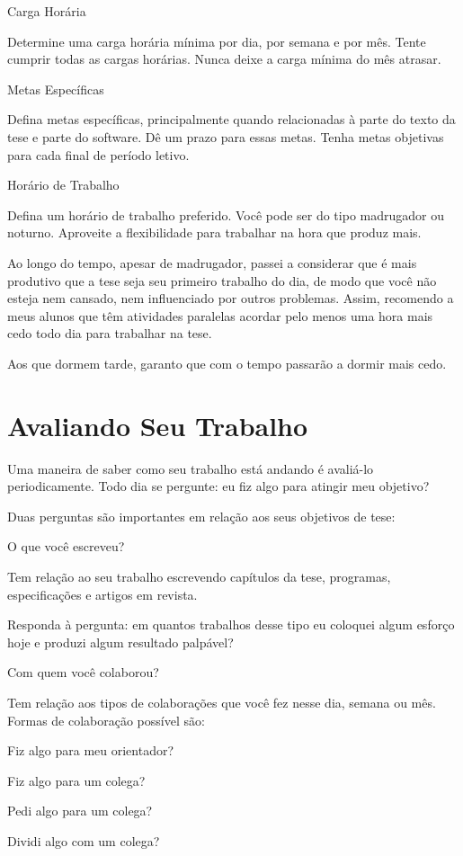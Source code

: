 \begin{outline}
\1	Carga Horária


\2	Determine uma carga horária mínima por dia, por semana e por mês. Tente cumprir todas as cargas horárias. Nunca deixe a carga mínima do mês atrasar.


\1	Metas Específicas


\2	Defina metas específicas, principalmente quando relacionadas à parte do texto da tese e parte do software. Dê um prazo para essas metas. Tenha metas objetivas para cada final de período letivo.


\1	Horário de Trabalho


\2	Defina um horário de trabalho preferido. Você pode ser do tipo madrugador ou noturno. Aproveite a flexibilidade para trabalhar na hora que produz mais. 


\3	Ao longo do tempo, apesar de madrugador, passei a considerar que é mais produtivo que a tese seja seu primeiro trabalho do dia, de modo que você não esteja nem cansado, nem influenciado por outros problemas. Assim, recomendo a meus alunos que têm atividades paralelas acordar pelo menos uma hora mais cedo todo dia para trabalhar na tese.


\1	Aos que dormem tarde, garanto que com o tempo passarão a dormir mais cedo.
\end{outline}

\section{Avaliando Seu Trabalho}


Uma maneira de saber como seu trabalho está andando é avaliá-lo periodicamente. Todo dia se pergunte: eu fiz algo para atingir meu objetivo?


Duas perguntas são importantes em relação aos seus objetivos de tese:

\begin{outline}
\1	O que você escreveu?


\2	Tem relação ao seu trabalho escrevendo capítulos da tese, programas, especificações e artigos em revista. 


\2	Responda à pergunta: em quantos trabalhos desse tipo eu coloquei algum esforço hoje e produzi algum resultado palpável?


\1	Com quem você colaborou?


\2	Tem relação aos tipos de colaborações que você fez nesse dia, semana ou mês. Formas de colaboração possível são:


\3	Fiz algo para meu orientador?


\3	Fiz algo para um colega?


\3	Pedi algo para um colega? 


\3	Dividi algo com um colega?
\end{outline}

